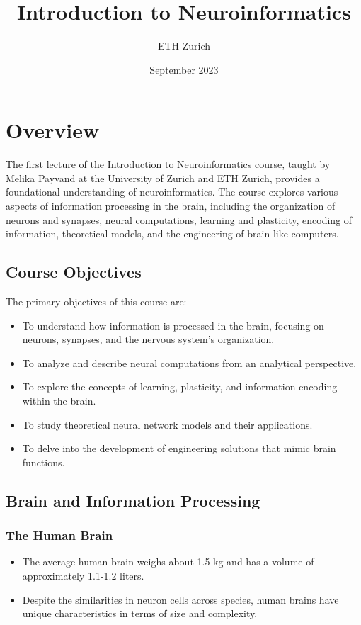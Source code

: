 \documentclass{article}
\title{Introduction to Neuroinformatics}
\author{ETH Zurich}
\date{September 2023}
\begin{document}
\maketitle

\section{Overview}
The first lecture of the Introduction to Neuroinformatics course, taught by Melika Payvand at the University of Zurich and ETH Zurich, provides a foundational understanding of neuroinformatics. The course explores various aspects of information processing in the brain, including the organization of neurons and synapses, neural computations, learning and plasticity, encoding of information, theoretical models, and the engineering of brain-like computers.

\subsection*{Course Objectives}
The primary objectives of this course are:
\begin{itemize}
    \item To understand how information is processed in the brain, focusing on neurons, synapses, and the nervous system's organization.
    \item To analyze and describe neural computations from an analytical perspective.
    \item To explore the concepts of learning, plasticity, and information encoding within the brain.
    \item To study theoretical neural network models and their applications.
    \item To delve into the development of engineering solutions that mimic brain functions.
\end{itemize}

\subsection{Brain and Information Processing}
\subsubsection{The Human Brain}
\begin{itemize}
    \item The average human brain weighs about 1.5 kg and has a volume of approximately 1.1-1.2 liters.
    \item Despite the similarities in neuron cells across species, human brains have unique characteristics in terms of size and complexity.
\end{itemize}
\end{document}
